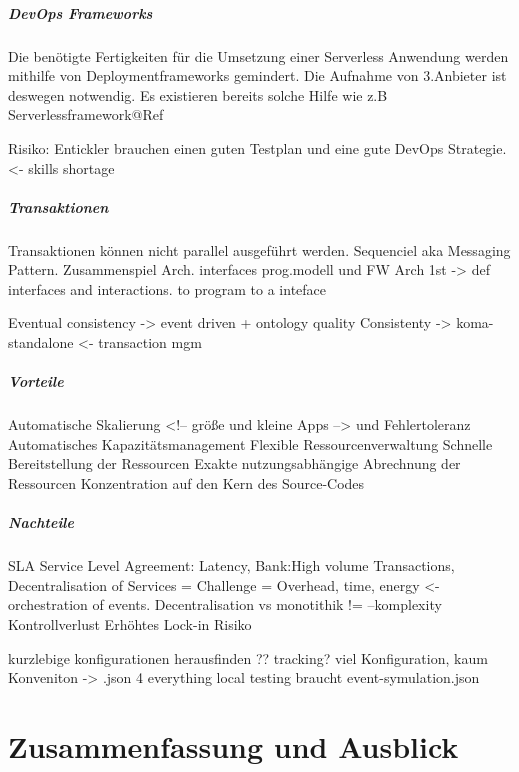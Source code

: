 \documentclass[
12pt,
english,
ngerman,
headsepline,
twoside,
openright,
numbers=noenddot,version=first
]{scrreprt}
\begin{document}
\paragraph{DevOps Frameworks}
Die benötigte Fertigkeiten für die Umsetzung einer Serverless Anwendung werden mithilfe von Deploymentframeworks gemindert. Die Aufnahme von 3.Anbieter ist deswegen notwendig. Es existieren bereits solche Hilfe wie z.B Serverlessframework@Ref

Risiko:
Entickler brauchen einen guten Testplan und eine gute DevOps Strategie.<- skills shortage

\paragraph{Transaktionen}
Transaktionen können nicht parallel ausgeführt werden. Sequenciel aka Messaging Pattern.
Zusammenspiel Arch. interfaces prog.modell und FW
Arch 1st -> def interfaces and interactions. to program to a inteface


Eventual consistency -> event driven + ontology quality
Consistenty -> koma-standalone <- transaction mgm

\paragraph{Vorteile}
Automatische Skalierung <!-- größe und kleine Apps --> und Fehlertoleranz
Automatisches Kapazitätsmanagement
Flexible Ressourcenverwaltung
Schnelle Bereitstellung der Ressourcen
Exakte nutzungsabhängige Abrechnung der Ressourcen
Konzentration auf den Kern des Source-Codes


\paragraph{Nachteile}


SLA Service Level Agreement: Latency, Bank:High volume Transactions,
Decentralisation of Services = Challenge = Overhead, time, energy <- orchestration of events.
Decentralisation vs monotithik != --komplexity
Kontrollverlust
Erhöhtes Lock-in Risiko

kurzlebige konfigurationen herausfinden ?? tracking?
viel Konfiguration, kaum Konveniton -> .json 4 everything
local testing braucht event-symulation.json

\chapter{Zusammenfassung und Ausblick}
\end{document}
